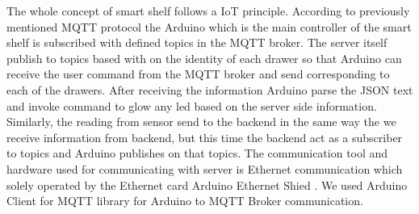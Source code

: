 The whole concept of smart shelf follows a IoT principle. 
According to previously mentioned MQTT protocol the Arduino which is the main controller of the smart shelf is subscribed with defined topics in the MQTT broker. 
The server itself publish to topics based with on the identity of each drawer so that Arduino can receive the user command from the MQTT broker and send corresponding to each of the drawers. 
After receiving the information Arduino parse the JSON text and invoke command to glow any led based on the server side information. 
Similarly, the reading from sensor send to the backend in the same way the we receive information from backend, but this time the backend act as a subscriber to topics and Arduino publishes on that topics. 
The communication tool and hardware used for communicating with server is Ethernet communication which solely operated by the Ethernet card Arduino Ethernet Shied \cite{RefWorks:EthernetArduino}.
We used Arduino Client for MQTT \cite{RefWorks:MQTTArduino} library for Arduino to MQTT Broker communication.